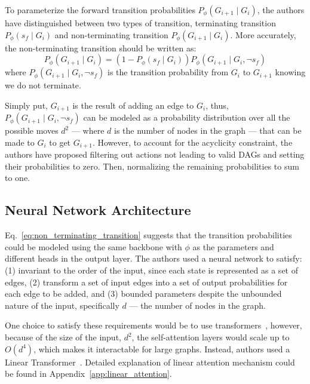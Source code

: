 \documentclass{lxaiproposal}
\begin{document}
    To parameterize the forward transition probabilities $P_{\phi}(G_{i+1} \mid G_i)$, the authors have distinguished
    between two types of transition, terminating transition $P_{\phi}(s_f \mid G_i)$ and non-terminating transition
    $P_{\phi}(G_{i+1} \mid G_i)$.
    More accurately, the non-terminating transition should be written as:
    \begin{equation}
        P_{\phi}(G_{i+1} \mid G_i) = (1-P_{\phi}(s_f \mid G_i)) P_{\phi}(G_{i+1} \mid G_i, \neg s_f)
        \label{eq:non_terminating_transition}
    \end{equation}
    where $P_{\phi}(G_{i+1} \mid G_i, \neg s_f)$ is the transition probability from $G_i$ to $G_{i+1}$ knowing we do not
    terminate.

    Simply put, $G_{i+1}$ is the result of adding an edge to $G_i$, thus, $P_{\phi}(G_{i+1} \mid G_i, \neg s_f)$ can
    be modeled
    as a probability distribution over all the possible moves $d^2$ --- where $d$ is the number of nodes in the graph ---
    that can be made to $G_i$ to get $G_{i+1}$. However, to account for the acyclicity constraint, the authors have
    proposed filtering out actions not leading to valid DAGs and setting their probabilities to zero. Then, normalizing
    the remaining probabilities to sum to one.

    \subsection{Neural Network Architecture}\label{sec:nn_architecture}
    \vspace*{-3mm}

    Eq.~\eqref{eq:non_terminating_transition} suggests that the transition probabilities could be modeled using the
    same backbone with $\phi$ as the parameters and different heads in the output layer. The authors used a neural
    network to satisfy: (1) invariant to the order of the input, since each state is represented as a set of edges,
    (2) transform a set of input edges into a set of output probabilities for each edge to be added, and (3) bounded
    parameters despite the unbounded nature of the input, specifically $d$ --- the number of nodes in the graph.

    One choice to satisfy these requirements would be to use transformers~\cite{vaswani2017attention}, however,
    because of the size of the input, $d^2$, the self-attention layers would scale up to $O(d^4)$, which makes it
    interactable for large graphs. Instead, authors used a Linear Transformer~\cite{katharopoulos2020transformers}.
    Detailed explanation of linear attention mechanism could be found in Appendix~\ref{app:linear_attention}.
\end{document}
